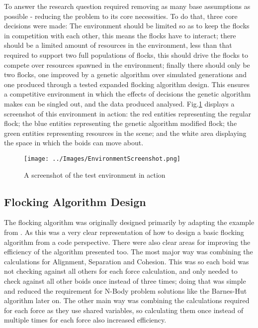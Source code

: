 To answer the research question required removing as many base assumptions as possible - reducing the problem to its core necessities. To do that, three core decisions were made: The environment should be limited so as to keep the flocks in competition with each other, this means the flocks have to interact; there should be a limited amount of resources in the environment, less than that required to support two full populations of flocks, this should drive the flocks to compete over resources spawned in the environment; finally there should only be two flocks, one improved by a genetic algorithm over simulated generations and one produced through a tested expanded flocking algorithm design. This ensures a competitive environment in which the effects of decisions the genetic algorithm makes can be singled out, and the data produced analysed. Fig.\ref{fig:EnvScrnshot} displays a screenshot of this environment in action: the red entities representing the regular flock; the blue entities representing the genetic algorithm modified flock; the green entities representing resources in the scene; and the white area displaying the space in which the boids can move about.
\begin{figure}
	\texttt{[image: ../Images/EnvironmentScreenshot.png]}
	\caption{A screenshot of the test environment in action}
	\label{fig:EnvScrnshot}
\end{figure}


\subsection{Flocking Algorithm Design}
The flocking algorithm was originally designed primarily by adapting the example from \citet{flockingprocessingorg}. As this was a very clear representation of how to design a basic flocking algorithm from a code perspective. There were also clear areas for improving the efficiency of the algorithm presented too. The most major way was combining the calculations for Alignment, Separation and Cohesion. This was so each boid was not checking against all others for each force calculation, and only needed to check against all other boids once instead of three times; doing that was simple and reduced the requirement for N-Body problem solutions like the Barnes-Hut algorithm later on. The other main way was combining the calculations required for each force as they use shared variables, so calculating them once instead of multiple times for each force also increased efficiency.

